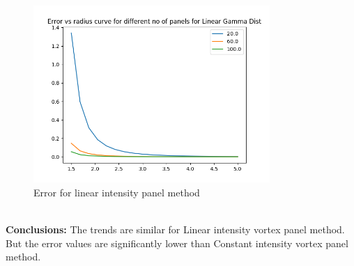\documentclass[a4paper,11pt]{article}
\begin{document}
	\begin{figure}[h]
	\centering
	\includegraphics[width = 0.8\textwidth]{q2linear_error.png}
	\caption{Error for linear intensity panel method}
	\label{fig:3b}
	\end{figure}
	\indent 
	\newpage 
	\indent\\
	\newpage
	\indent \textbf{Conclusions:} The trends are similar for Linear intensity vortex panel method. But the error values are significantly lower than Constant intensity vortex panel method.   
	
	
	
	
\end{document}
